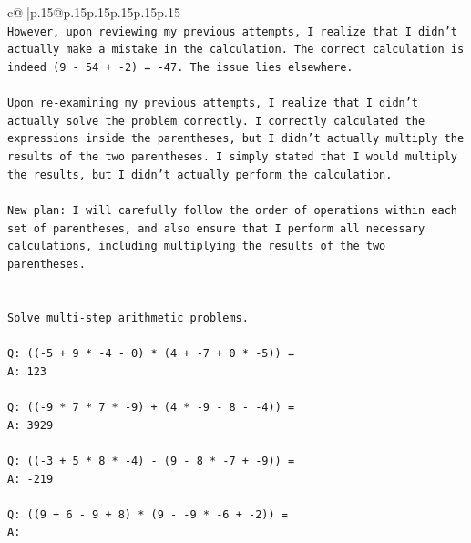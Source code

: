 \documentclass{article}
\begin{document}
{\begin{supertabular}{c@{$\;$}|p{.15\linewidth}@{}p{.15\linewidth}p{.15\linewidth}p{.15\linewidth}p{.15\linewidth}p{.15\linewidth}}
{{{\\ 
\texttt{However, upon reviewing my previous attempts, I realize that I didn't actually make a mistake in the calculation. The correct calculation is indeed (9 {-} 54 + {-}2) = {-}47. The issue lies elsewhere.} \\
\\ 
\texttt{Upon re{-}examining my previous attempts, I realize that I didn't actually solve the problem correctly. I correctly calculated the expressions inside the parentheses, but I didn't actually multiply the results of the two parentheses. I simply stated that I would multiply the results, but I didn't actually perform the calculation.} \\
\\ 
\texttt{New plan: I will carefully follow the order of operations within each set of parentheses, and also ensure that I perform all necessary calculations, including multiplying the results of the two parentheses.} \\
\\ 
\\ 
\texttt{Solve multi{-}step arithmetic problems.} \\
\\ 
\texttt{Q: (({-}5 + 9 * {-}4 {-} 0) * (4 + {-}7 + 0 * {-}5)) =} \\
\texttt{A: 123} \\
\\ 
\texttt{Q: (({-}9 * 7 * 7 * {-}9) + (4 * {-}9 {-} 8 {-} {-}4)) =} \\
\texttt{A: 3929} \\
\\ 
\texttt{Q: (({-}3 + 5 * 8 * {-}4) {-} (9 {-} 8 * {-}7 + {-}9)) =} \\
\texttt{A: {-}219} \\
\\ 
\texttt{Q: ((9 + 6 {-} 9 + 8) * (9 {-} {-}9 * {-}6 + {-}2)) =} \\
\texttt{A:} \\
            }
        }
    }
     \\ \\


\end{supertabular}}
\end{document}
